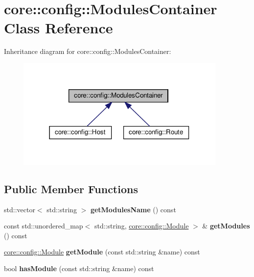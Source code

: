 \hypertarget{classcore_1_1config_1_1ModulesContainer}{}\section{core\+:\+:config\+:\+:Modules\+Container Class Reference}
\label{classcore_1_1config_1_1ModulesContainer}


Inheritance diagram for core\+:\+:config\+:\+:Modules\+Container\+:
\nopagebreak
\begin{figure}[H]
\begin{center}
\leavevmode
\includegraphics[width=294pt]{classcore_1_1config_1_1ModulesContainer__inherit__graph}
\end{center}
\end{figure}
\subsection*{Public Member Functions}
\begin{DoxyCompactItemize}
\item 
\mbox{\label{classcore_1_1config_1_1ModulesContainer_a7c1e7b912e1310059e7bfe3a48cb0688}} 
std\+::vector$<$ std\+::string $>$ {\bfseries get\+Modules\+Name} () const
\item 
\mbox{\label{classcore_1_1config_1_1ModulesContainer_a9a12b9494161665e47e96124f1833178}} 
const std\+::unordered\+\_\+map$<$ std\+::string, \hyperlink{classcore_1_1config_1_1Module}{core\+::config\+::\+Module} $>$ \& {\bfseries get\+Modules} () const
\item 
\mbox{\label{classcore_1_1config_1_1ModulesContainer_a8be58c3b8ada51dc2834e1e142746686}} 
\hyperlink{classcore_1_1config_1_1Module}{core\+::config\+::\+Module} {\bfseries get\+Module} (const std\+::string \&name) const
\item 
\mbox{\label{classcore_1_1config_1_1ModulesContainer_abc911e006a70687a07fa79d755045dea}} 
bool {\bfseries has\+Module} (const std\+::string \&name) const
\end{DoxyCompactItemize}
